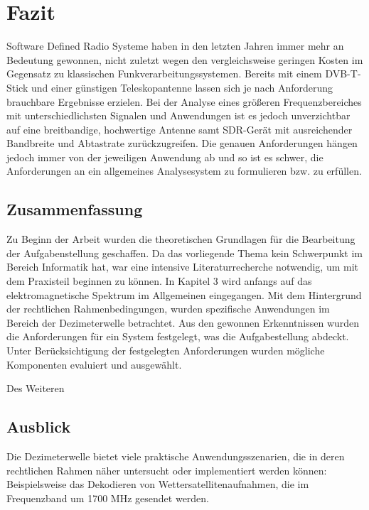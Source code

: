 
\chapter{Fazit}
Software Defined Radio Systeme haben in den letzten Jahren immer mehr an Bedeutung gewonnen, nicht zuletzt wegen den vergleichsweise geringen Kosten im Gegensatz zu klassischen Funkverarbeitungssystemen.
Bereits mit einem DVB-T-Stick und einer günstigen Teleskopantenne lassen sich je nach Anforderung brauchbare Ergebnisse erzielen. Bei der Analyse eines größeren Frequenzbereiches mit unterschiedlichsten Signalen und Anwendungen ist es jedoch unverzichtbar auf eine breitbandige, hochwertige Antenne samt SDR-Gerät mit ausreichender Bandbreite und Abtastrate zurückzugreifen. Die genauen Anforderungen hängen jedoch immer von der jeweiligen Anwendung ab und so ist es schwer, die Anforderungen an ein allgemeines Analysesystem zu formulieren bzw. zu erfüllen.



\section{Zusammenfassung}
Zu Beginn der Arbeit wurden die theoretischen Grundlagen für die Bearbeitung der Aufgabenstellung geschaffen. Da das vorliegende Thema kein Schwerpunkt im Bereich Informatik hat, war eine intensive Literaturrecherche notwendig, um mit dem Praxisteil beginnen zu können. In Kapitel 3 wird anfangs auf das elektromagnetische Spektrum im Allgemeinen eingegangen. Mit dem Hintergrund der rechtlichen Rahmenbedingungen, wurden spezifische Anwendungen im Bereich der Dezimeterwelle betrachtet. Aus den gewonnen Erkenntnissen wurden die Anforderungen für ein System festgelegt, was die Aufgabestellung abdeckt. Unter Berücksichtigung der festgelegten Anforderungen wurden mögliche Komponenten evaluiert und ausgewählt.

Des Weiteren 


\section{Ausblick}
Die Dezimeterwelle bietet viele praktische Anwendungsszenarien, die in deren rechtlichen Rahmen näher untersucht oder implementiert werden können:
Beispielsweise das Dekodieren von Wettersatellitenaufnahmen, die im Frequenzband um 1700 MHz gesendet werden. 